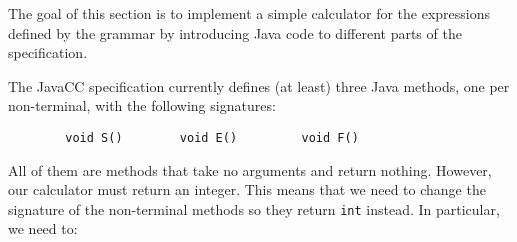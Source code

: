 \documentclass{article}
\begin{document}
The goal of this section is to implement a simple calculator for the expressions defined by the grammar by introducing Java code to different parts of the specification.

The JavaCC specification currently defines (at least) three Java methods, one per non-terminal, with the following signatures:

\begin{verbatim}
        void S()        void E()         void F()
\end{verbatim}

All of them are methods that take no arguments and return nothing. However, our calculator must return an integer. This means that we need to change the signature of the non-terminal methods so they return {\tt int} instead. In particular, we need to:
\end{document}
